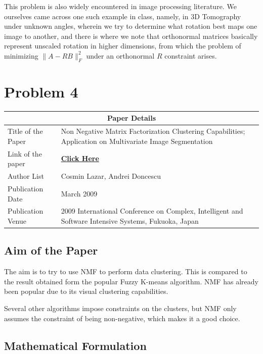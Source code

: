 \documentclass[a4paper,14pt]{article}
\numberwithin{definition}{section}
\numberwithin{mytheorem}{subsection}
\begin{document}
This problem is also widely encountered in image processing literature. We ourselves came across one such example in class, namely, in 3D Tomography under unknown angles, wherein we try to determine what rotation best maps one image to another, and there is where we note that orthonormal matrices basically represent unscaled rotation in higher dimensions, from which the problem of minimizing $\lVert A - RB\rVert^2_F$ under an orthonormal $R$ constraint arises.


\section{Problem 4}



\begin{center}
    \begin{tabular}{ |p{3.5cm}||p{10cm}|}
   
    \hline
    \multicolumn{2}{|c|}{Paper Details} \\
    \hline
    Title of the Paper& Non Negative Matrix Factorization Clustering Capabilities; Application on Multivariate Image Segmentation\\
    \hline
    Link of the paper  &  \href{https://ieeexplore.ieee.org/abstract/document/5066901}{\textbf{Click Here}}  \\
    \hline
    Author List & Cosmin Lazar, Andrei Doncescu\\
    \hline
    Publication Date  & March 2009 \\
    \hline
    Publication Venue  &  2009 International Conference on Complex, Intelligent and Software Intensive Systems, Fukuoka, Japan \\
    \hline
   \end{tabular}
\end{center}

\subsection{Aim of the Paper}

The aim is to try to use NMF to perform data clustering. This is compared to the result obtained form the popular Fuzzy K-means algorithm. NMF has already been popular due to its visual clustering capabilities.

Several other algorithms impose constraints on the clusters, but NMF only assumes the constraint of being non-negative, which makes it a good choice.


\subsection{Mathematical Formulation}
\end{document}
